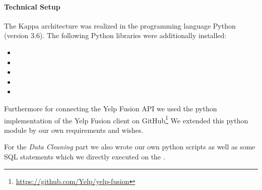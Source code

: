 \paragraph{Technical Setup}
\label{par:setup}
The Kappa architecture was realized in the programming language Python (version 3.6).
The following Python libraries were additionally installed:

\begin{itemize}
  \item {}
  \item {}
  \item {}
  \item {}
  \item {}
\end{itemize}

Furthermore for connecting the Yelp Fusion \ac{API} we used the python implementation of the Yelp Fusion client on GitHub\footnote{\url{https://github.com/Yelp/yelp-fusion}}
We extended this python module by our own requirements and wishes.

For the \textit{Data Cleaning} part we also wrote our own python scripts as well as some \ac{SQL} statements which we directly executed on the \pg{}.
